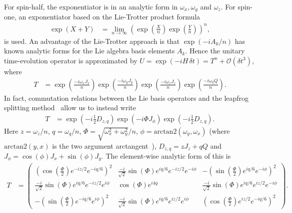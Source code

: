 \documentclass{jors}
\begin{document}
		For spin-half, the exponentiator is in an analytic form in $ \omega_x, \omega_y $ and $ \omega_z $. %
		For spin-one, an exponentiator based on the Lie-Trotter product formula~\cite{moler_nineteen_2003}
		\begin{align}
			\exp\left( X + Y\right) &= \lim_{n\to\infty} \left(\exp\left(\frac{X}{n}\right) \exp\left(\frac{Y}{n}\right)\right)^n,\label{eq:lie_trotter}
		\end{align}
		is used.
		An advantage of the Lie-Trotter approach is that $ \exp(-iA_k/n) $ has known analytic forms for the Lie algebra basis elements $ A_k $.
		Hence the unitary time-evolution operator is approximated by $ U = \exp(-iH\,\delta t) = T^n + \mathcal{O}(\delta t^3) $, where
		\begin{align}
			T &= \exp\left(\frac{-i \omega_x J_x}{n}\right) \exp\left(\frac{-i \omega_y J_y}{n}\right) \exp\left(\frac{-i \omega_z J_z}{n}\right) \exp\left(\frac{-i \omega_q Q}{n}\right).
		\end{align}
		In fact, commutation relations between the Lie basis operators and the leapfrog splitting method~\cite{barthel_optimized_2020} allow us to instead write 
		\begin{align}
			T &= \exp\left(-i\frac12D_{z,q}\right)\exp(-i\Phi J_\phi)\exp\left(-i\frac12D_{z,q}\right).
		\end{align}
		Here $ z = \omega_z/n $, $q = \omega_q/n $, $ \Phi = \sqrt{\omega_x^2 + \omega_y^2}/n $, $ \phi = \text{arctan}2(\omega_y, \omega_x) $ (where $ \text{arctan}2(y, x) $ is the two argument arctangent~\cite{organick_fortran_1966}), $ D_{z,q} = zJ_z + qQ $ and $ J_\phi = \cos(\phi) J_x + \sin(\phi) J_y $.
		The element-wise analytic form of this is
		\begin{align}
			T &= \begin{pmatrix}
				\left(\cos\left(\frac{\Phi}{2}\right) e^{-iz/2}e^{-iq/6}\right)^2 & \frac{-i}{\sqrt{2}} \sin(\Phi)e^{iq/6}e^{-iz/2}e^{-i\phi} & -\left(\sin\left(\frac{\Phi}{2}\right)e^{iq/6}e^{-i\phi}\right)^2\\
				\frac{-i}{\sqrt{2}} \sin(\Phi)e^{iq/6}e^{-iz/2}e^{i\phi} & \cos(\Phi)e^{i4q} & \frac{-i}{\sqrt{2}} \sin(\Phi)e^{iq/6}e^{iz/2}e^{-i\phi}\\
				-\left(\sin\left(\frac{\Phi}{2}\right)e^{-iq/6}e^{i\phi}\right)^2 & \frac{-i}{\sqrt{2}} \sin(\Phi)e^{iq/6}e^{iz/2}e^{i\phi} & \left(\cos\left(\frac{\Phi}{2}\right) e^{iz/2}e^{-iq/6}\right)^2
			\end{pmatrix}.\label{eq:lie_trotter_4}
		\end{align}
\end{document}
